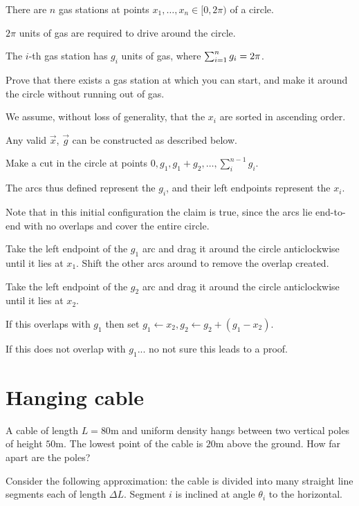 \documentclass[12pt]{article}
\begin{document}
\begin{mdframed}
  There are $n$ gas stations at points $x_1, \ldots, x_n \in [0, 2\pi)$ of a circle.

  $2\pi$ units of gas are required to drive around the circle.

  The $i$-th gas station has $g_i$ units of gas, where $\sum_{i=1}^{n} g_i = 2\pi$.

  Prove that there exists a gas station at which you can start, and make it around the circle
  without running out of gas.
\end{mdframed}

We assume, without loss of generality, that the $x_i$ are sorted in ascending order.

Any valid $\vec x$, $\vec g$ can be constructed as described below.

Make a cut in the circle at points $0, g_1, g_1 + g_2, \ldots, \sum_i^{n-1}g_i$.

The arcs thus defined represent the $g_i$, and their left endpoints represent the $x_i$.

Note that in this initial configuration the claim is true, since the arcs lie end-to-end with no
overlaps and cover the entire circle.

Take the left endpoint of the $g_1$ arc and drag it around the circle anticlockwise until it lies
at $x_1$. Shift the other arcs around to remove the overlap created.

Take the left endpoint of the $g_2$ arc and drag it around the circle anticlockwise until it lies
at $x_2$.

If this overlaps with $g_1$ then set $g_1 \leftarrow x_2, g_2 \leftarrow g_2 + (g_1 - x_2)$.

If this does not overlap with $g_1$... no not sure this leads to a proof.

\section{Hanging cable}

\begin{mdframed}
  A cable of length $L=80$m and uniform density hangs between two vertical poles of height
  $50$m. The lowest point of the cable is $20$m above the ground. How far apart are the poles?
\end{mdframed}

Consider the following approximation: the cable is divided into many straight line segments each of
length $\Delta L$. Segment $i$ is inclined at angle $\theta_i$ to the horizontal.
\end{document}
